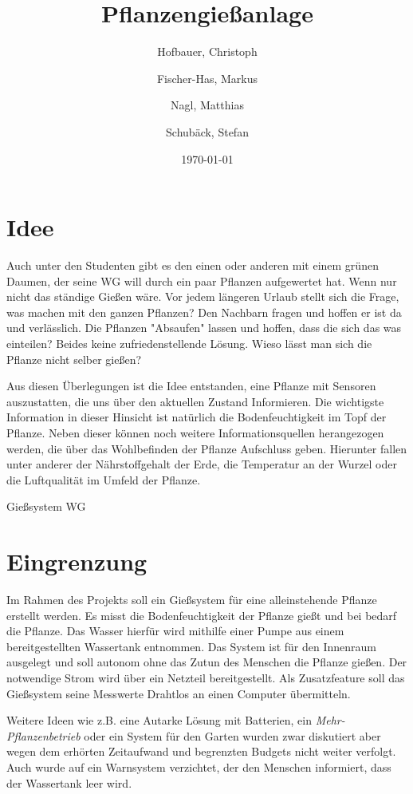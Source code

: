 \documentclass[]{IEEEtran}
\title{Pflanzengießanlage}
\date{\today}
\author{Hofbauer, Christoph \and Fischer-Has, Markus \and Nagl, Matthias \and Schubäck, Stefan}
\begin{document}
	\maketitle


\section{Idee}\label{refIdee}
Auch unter den Studenten gibt es den einen oder anderen mit einem grünen Daumen, der seine WG will durch ein paar Pflanzen aufgewertet hat. Wenn nur nicht das ständige Gießen wäre. Vor jedem längeren Urlaub stellt sich die Frage, was machen mit den ganzen Pflanzen? Den Nachbarn fragen und hoffen er ist da und verlässlich. Die Pflanzen "Absaufen" lassen und hoffen, dass die sich das was einteilen? Beides keine zufriedenstellende Lösung. Wieso lässt man sich die Pflanze nicht selber gießen?

Aus diesen Überlegungen ist die Idee entstanden, eine Pflanze mit Sensoren auszustatten, die uns über den aktuellen Zustand Informieren. Die wichtigste Information in dieser Hinsicht ist natürlich die Bodenfeuchtigkeit im Topf der Pflanze. Neben dieser können noch weitere Informationsquellen herangezogen werden, die über das Wohlbefinden der Pflanze Aufschluss geben. Hierunter fallen unter anderer der Nährstoffgehalt der Erde, die Temperatur an der Wurzel oder die Luftqualität im Umfeld der Pflanze.

Gießsystem WG


\section{Eingrenzung}
Im Rahmen des Projekts soll ein Gießsystem für eine alleinstehende Pflanze erstellt werden. Es misst die Bodenfeuchtigkeit der Pflanze gießt und bei bedarf die Pflanze. Das Wasser hierfür wird mithilfe einer Pumpe aus einem bereitgestellten Wassertank entnommen. Das System ist für den Innenraum ausgelegt und soll autonom ohne das Zutun des Menschen die Pflanze gießen. Der notwendige Strom wird über ein Netzteil bereitgestellt. Als Zusatzfeature soll das Gießsystem seine Messwerte Drahtlos an einen Computer übermitteln.
 
Weitere Ideen wie z.B. eine Autarke Lösung mit Batterien, ein \emph{Mehr-Pflanzenbetrieb} oder ein System für den Garten wurden zwar diskutiert aber wegen dem erhörten Zeitaufwand und begrenzten Budgets nicht weiter verfolgt. Auch wurde auf ein Warnsystem verzichtet, der den Menschen informiert, dass der Wassertank leer wird. 
\end{document}
